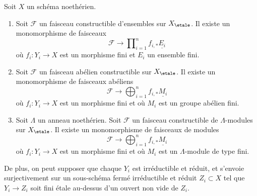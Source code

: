 \begin{lemma}
\label{lemma-constructible-maps-into-constant}
Soit $X$ un schéma noethérien.
\begin{enumerate}
\item Soit $\mathcal{F}$ un faisceau constructible d'ensembles sur $X_\etale$.
Il existe un monomorphisme de faisceaux
$$
\mathcal{F} \longrightarrow
\prod\nolimits_{i = 1}^n f_{i, *}\underline{E_i}
$$
où $f_i : Y_i \to X$ est un morphisme fini et $E_i$ un ensemble fini.
\item Soit $\mathcal{F}$ un faisceau abélien constructible sur $X_\etale$.
Il existe un monomorphisme de faisceaux abéliens
$$
\mathcal{F} \longrightarrow
\bigoplus\nolimits_{i = 1}^n f_{i, *}\underline{M_i}
$$
où $f_i : Y_i \to X$ est un morphisme fini et où
$M_i$ est un groupe abélien fini.
\item Soit $\Lambda$ un anneau noethérien.
Soit $\mathcal{F}$ un faisceau constructible de $\Lambda$-modules sur $X_\etale$.
Il existe un monomorphisme de faisceaux de modules
$$
\mathcal{F} \longrightarrow
\bigoplus\nolimits_{i = 1}^n f_{i, *}\underline{M_i}
$$
où $f_i : Y_i \to X$ est un morphisme fini et où
$M_i$ est un $\Lambda$-module de type fini.
\end{enumerate}
De plus, on peut supposer que chaque $Y_i$ est irréductible et réduit, et s'envoie
surjectivement sur un sous-schéma fermé irréductible et réduit $Z_i \subset X$ tel que
$Y_i \to Z_i$ soit fini \'etale au-dessus d'un ouvert non vide de $Z_i$.
\end{lemma}

